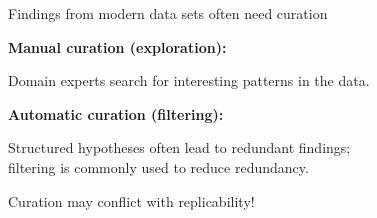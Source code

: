 \documentclass{beamer}
\begin{document}
\begin{frame}{Findings from modern data sets often need curation}
	
\textbf{Manual curation (exploration):}

Domain experts search for interesting patterns in the data.

\vspace{0.1in}

\textbf{Automatic curation (filtering):}

Structured hypotheses often lead to redundant findings; \\ filtering is commonly used to reduce redundancy.

\pause

\vspace{0.1in}

%	

\color{red}
Curation may conflict with replicability!

	
\end{frame}
\end{document}
